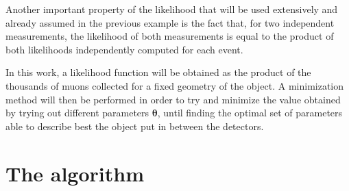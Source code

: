 \documentclass[a4paper, 11pt]{report}
\begin{document}
Another important property of the likelihood that will be used extensively and already assumed in the previous example is the fact that, for two independent measurements, the likelihood of both measurements is equal to the product of both likelihoods independently computed for each event.

In this work, a likelihood function will be obtained as the product of the thousands of muons collected for a fixed geometry of the object. A minimization method will then be performed in order to try and minimize the value obtained by trying out different parameters $\bm \theta$, until finding the optimal set of parameters able to describe best the object put in between the detectors.






























\chapter{The algorithm} \label{chapter:algorithm}
\end{document}
